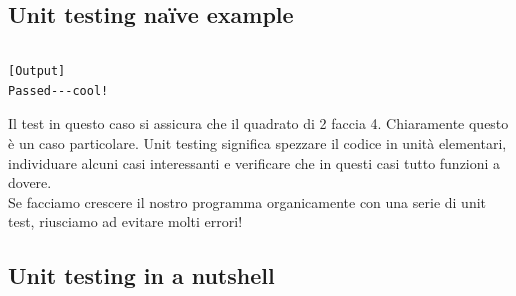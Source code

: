\subsection{Unit testing na\"ive example}

\inputminted{python}{snippets/unit_test_naive.py}

\begin{verbatim}
[Output]
Passed---cool!
\end{verbatim} 

Il test in questo caso si assicura che il quadrato di 2 faccia 4.
Chiaramente questo è un caso particolare. Unit testing significa spezzare il codice in unità elementari, individuare alcuni casi interessanti e verificare che in questi casi tutto funzioni a dovere.\\
Se facciamo crescere il nostro programma organicamente con una serie di unit test, riusciamo ad evitare molti errori!

\subsection{Unit testing in a nutshell}

